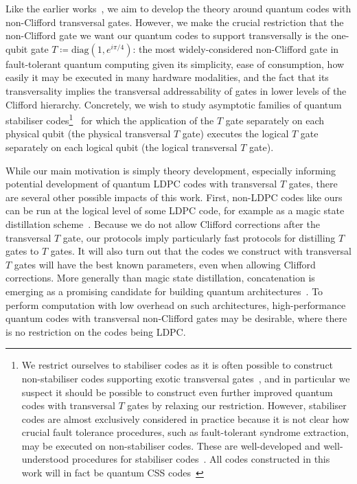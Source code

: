 \documentclass{article}
\newcounter{main}[section]
\begin{document}
Like the earlier works~\cite{wills2024,golowich2025asymptotically,nguyen2024good}, we aim to develop the theory around quantum codes with non-Clifford transversal gates. However, we make the crucial restriction that the non-Clifford gate we want our quantum codes to support transversally is the one-qubit gate $T \coloneq \text{diag}(1,e^{i\pi/4})$: the most widely-considered non-Clifford gate in fault-tolerant quantum computing given its simplicity, ease of consumption, how easily it may be executed in many hardware modalities, and the fact that its transversality implies the transversal addressability of gates in lower levels of the Clifford hierarchy. Concretely, we wish to study asymptotic families of quantum stabiliser codes\footnote{We restrict ourselves to stabiliser codes as it is often possible to construct non-stabiliser codes supporting exotic transversal gates~\cite{kubischta2023family,pollatsek2004permutationally,kubischta2024permutation,kubischta2024quantum,zhang2025transversal}, and in particular we suspect it should be possible to construct even further improved quantum codes with transversal $T$ gates by relaxing our restriction. However, stabiliser codes are almost exclusively considered in practice because it is not clear how crucial fault tolerance procedures, such as fault-tolerant syndrome extraction, may be executed on non-stabiliser codes. These are well-developed and well-understood procedures for stabiliser codes~\cite{Gottesman}. All codes constructed in this work will in fact be quantum CSS codes~\cite{calderbank1996good,steane1996multiple}}~\cite{gottesman1997stabilizer} for which the application of the $T$ gate separately on each physical qubit (the physical transversal $T$ gate) executes the logical $T$ gate separately on each logical qubit (the logical transversal $T$ gate). 

While our main motivation is simply theory development, especially informing potential development of quantum LDPC codes with transversal $T$ gates, there are several other possible impacts of this work. First, non-LDPC codes like ours can be run at the logical level of some LDPC code, for example as a magic state distillation scheme~\cite{MSD}. Because we do not allow Clifford corrections after the transversal $T$ gate, our protocols imply particularly fast protocols for distilling $T$ gates to $T$ gates. It will also turn out that the codes we construct with transversal $T$ gates will have the best known parameters, even when allowing Clifford corrections. More generally than magic state distillation, concatenation is emerging as a promising candidate for building quantum architectures~\cite{pattison2025hierarchical,gidney2025yoked,wills2026concatenating}. To perform computation with low overhead on such architectures, high-performance quantum codes with transversal non-Clifford gates may be desirable, where there is no restriction on the codes being LDPC.
\end{document}
